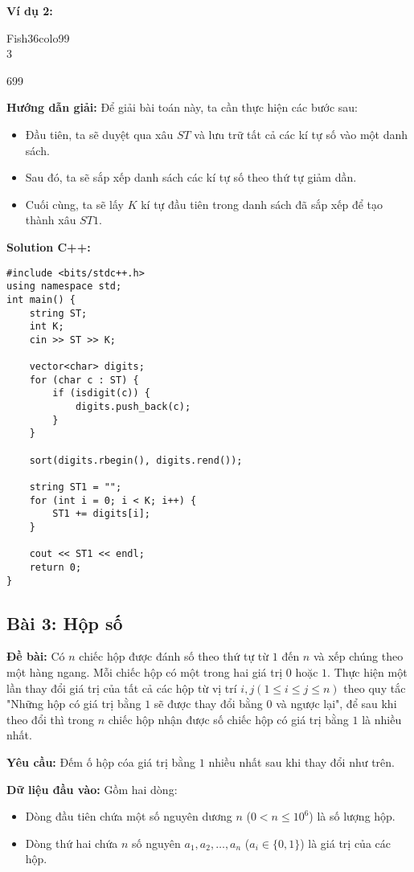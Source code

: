 \documentclass[12pt]{scrartcl}  %
\begin{document}
\textbf{Ví dụ 2:}
\begin{tcolorbox}[colback=gray!5!white, colframe=blue!50!black, title=Input]
Fish36colo99\\
3
\end{tcolorbox}
\begin{tcolorbox}[colback=gray!5!white, colframe=green!50!black, title=Output]
699
\end{tcolorbox}
\textbf{Hướng dẫn giải:}
Để giải bài toán này, ta cần thực hiện các bước sau:
\begin{itemize}
    \item Đầu tiên, ta sẽ duyệt qua xâu $ST$ và lưu trữ tất cả các kí tự số vào một danh sách.
    \item Sau đó, ta sẽ sắp xếp danh sách các kí tự số theo thứ tự giảm dần.
    \item Cuối cùng, ta sẽ lấy $K$ kí tự đầu tiên trong danh sách đã sắp xếp để tạo thành xâu $ST1$.
\end{itemize}
\textbf{Solution C++:}
\begin{lstlisting}
#include <bits/stdc++.h>
using namespace std;
int main() {
    string ST;
    int K;
    cin >> ST >> K;

    vector<char> digits;
    for (char c : ST) {
        if (isdigit(c)) {
            digits.push_back(c);
        }
    }

    sort(digits.rbegin(), digits.rend()); 

    string ST1 = "";
    for (int i = 0; i < K; i++) {
        ST1 += digits[i];
    }

    cout << ST1 << endl;
    return 0;
}
\end{lstlisting}

\subsection{Bài 3: Hộp số}
\textbf{Đề bài:}
Có $n$ chiếc hộp được đánh số theo thứ tự từ $1$ đến $n$ và xếp chúng theo một hàng ngang. Mỗi chiếc hộp 
có một trong hai giá trị $0$ hoặc $1$. Thực hiện một lần thay đổi giá trị của tất cả các hộp từ vị trí $i, j (1 \leq i \leq j \leq n)$ theo quy 
tắc "Những hộp có giá trị bằng $1$ sẽ được thay đổi bằng $0$ và ngược lại", để sau khi theo đổi thì trong $n$ chiếc hộp nhận được số chiếc hộp có giá trị bằng $1$ là nhiều nhất.

\textbf{Yêu cầu:}
Đếm ố hộp cóa giá trị bằng $1$ nhiều nhất sau khi thay đổi như trên.

\textbf{Dữ liệu đầu vào:}
Gồm hai dòng:
\begin{itemize}
    \item Dòng đầu tiên chứa một số nguyên dương $n$ ($0 < n \leq 10^6$) là số lượng hộp.
    \item Dòng thứ hai chứa $n$ số nguyên $a_1, a_2, \ldots, a_n$ ($a_i \in \{0, 1\}$) là giá trị của các hộp.
\end{itemize}
\end{document}
